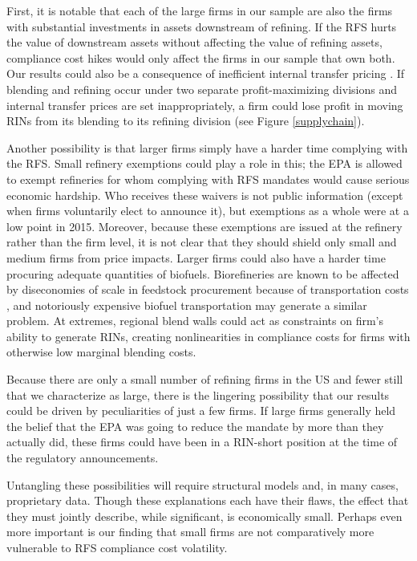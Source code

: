 \documentclass[11pt]{article}
\begin{document}
First, it is notable that each of the large firms in our sample are also the firms with substantial investments in assets downstream of refining. If the RFS hurts the value of downstream assets without affecting the value of refining assets, compliance cost hikes would only affect the firms in our sample that own both. Our results could also be a consequence of inefficient internal transfer pricing \citep{Hirshleifer1956}. If blending and refining occur under two separate profit-maximizing divisions and internal transfer prices are set inappropriately, a firm could lose profit in moving RINs from its blending to its refining division (see Figure \ref{supplychain}). 

Another possibility is that larger firms simply have a harder time complying with the RFS. Small refinery exemptions could play a role in this; the EPA is allowed to exempt refineries for whom complying with RFS mandates would cause serious economic hardship. Who receives these waivers is not public information (except when firms voluntarily elect to announce it), but exemptions as a whole were at a low point in 2015.  Moreover, because these exemptions are issued at the refinery rather than the firm level, it is not clear that they should shield only small and medium firms from price impacts. Larger firms could also have a harder time procuring adequate quantities of biofuels. Biorefineries are known to be affected by diseconomies of scale in feedstock procurement because of transportation costs \citep{Nguyen1996}, and notoriously expensive biofuel transportation may generate a similar problem. At extremes, regional blend walls could act as constraints on firm's ability to generate RINs, creating nonlinearities in compliance costs for firms with otherwise low marginal blending costs. 

Because there are only a small number of refining firms in the US and fewer still that we characterize as large, there is the lingering possibility that our results could be driven by peculiarities of just a few firms. If large firms generally held the belief that the EPA was going to reduce the mandate by more than they actually did, these firms could have been in a RIN-short position at the time of the regulatory announcements.  

Untangling these possibilities will require structural models and, in many cases, proprietary data. Though these explanations each have their flaws, the effect that they must jointly describe, while significant, is economically small. Perhaps even more important is our finding that small firms are not comparatively more vulnerable to RFS compliance cost volatility. 
\end{document}
